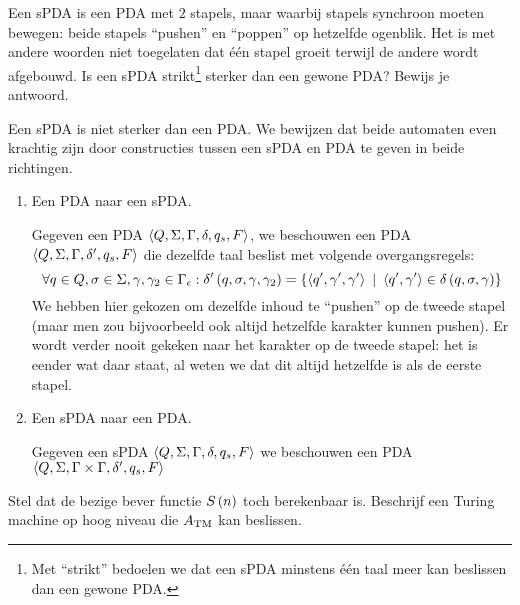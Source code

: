 \documentclass{article}
\begin{document}
\begin{question}
Een sPDA is een PDA met $2$ stapels, maar waarbij stapels synchroon moeten bewegen: beide stapels ``pushen'' en ``poppen'' op hetzelfde ogenblik. Het is met andere woorden niet toegelaten dat \'e\'en stapel groeit terwijl de andere wordt afgebouwd. Is een sPDA strikt\footnote{Met ``strikt'' bedoelen we dat een sPDA minstens \'e\'en taal meer kan beslissen dan een gewone PDA.} sterker dan een gewone PDA? Bewijs je antwoord.
\begin{answer}
Een sPDA is niet sterker dan een PDA. We bewijzen dat beide automaten even krachtig zijn door constructies tussen een sPDA en PDA te geven in beide richtingen.
\begin{enumerate}
 \item Een PDA naar een sPDA.
 \begin{construction}
  Gegeven een PDA $\left\langle Q,\Sigma,\Gamma,\delta,q_s,F \right\rangle$, we beschouwen een PDA $\left\langle Q,\Sigma,\Gamma,\delta',q_s,F \right\rangle$ die dezelfde taal beslist met volgende overgangsregels:
  \begin{equation}
  \forall q\in Q,\sigma\in\Sigma,\gamma,\gamma_2\in\Gamma_{\epsilon}:\delta'\left( q,\sigma,\gamma,\gamma_2 \right)=\left\{ \left\langle q',\gamma',\gamma' \right\rangle\ |\ \left\langle q',\gamma' \right\rangle\in\delta\left( q,\sigma,\gamma \right) \right\}
  \end{equation}
  We hebben hier gekozen om dezelfde inhoud te ``pushen'' op de tweede stapel (maar men zou bijvoorbeeld ook altijd hetzelfde karakter kunnen pushen). Er wordt verder nooit gekeken naar het karakter op de tweede stapel: het is eender wat daar staat, al weten we dat dit altijd hetzelfde is als de eerste stapel.
 \end{construction}
 \item Een sPDA naar een PDA.
 \begin{construction}
  Gegeven een sPDA $\left\langle Q,\Sigma,\Gamma,\delta,q_s,F \right\rangle$ we beschouwen een PDA $\left\langle Q,\Sigma,\Gamma\times\Gamma,\delta',q_s,F \right\rangle$
 \end{construction}
\end{enumerate}
\end{answer}
\end{question}

\begin{question}
Stel dat de bezige bever functie $S\left( n \right)$ toch berekenbaar is. Beschrijf een Turing machine op hoog niveau die $A_{\rm TM}$ kan beslissen.
\end{question}
\end{document}
